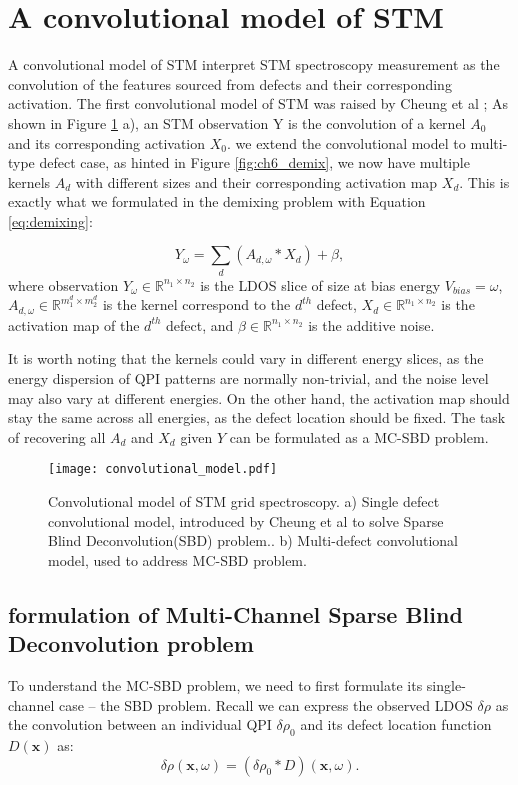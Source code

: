 \section{A convolutional model of STM}
A convolutional model of STM interpret STM spectroscopy measurement as the convolution of the features sourced from defects and their corresponding activation. The first convolutional model of STM was raised by Cheung et al \cite{cheungDictionaryLearningFouriertransform2020}; As shown in Figure \ref{fig:ch6_conv} a), an STM observation Y is the convolution of a kernel $A_0$ and its corresponding activation $X_0$. we extend the convolutional model to multi-type defect case, as hinted in Figure \ref{fig:ch6_demix}, we now have multiple kernels $A_d$ with different sizes and their corresponding activation map $X_d$. This is exactly what we formulated in the demixing problem with Equation \ref{eq:demixing}:

\begin{equation}
	Y_{\omega} = \sum_d ( A_{d,{\omega}} * X_d) + \beta,
\end{equation}
\noindent where observation $Y_{\omega} \in \mathbb{R}^{n_1 \times n_2}$ is the \ac{LDOS} slice of size at bias energy $V_{bias} = \omega$, $A_{d,{\omega}} \in \mathbb{R}^{m_1^d \times m_2^d}$ is the kernel correspond to the $d^{th}$ defect, $X_{d} \in \mathbb{R}^{n_1 \times n_2}$ is the activation map of the $d^{th}$ defect, and $\beta \in \mathbb{R}^{n_1 \times n_2}$ is the additive noise. 

\noindent It is worth noting that the kernels could vary in different energy slices, as the energy dispersion of QPI patterns are normally non-trivial, and the noise level may also vary at different energies. On the other hand, the activation map should stay the same across all energies, as the defect location should be fixed. The task of recovering all $A_d$ and $X_d$ given $Y$ can be formulated as a \ac{MC-SBD} problem. 
 
\begin{figure}
	\texttt{[image: convolutional\_model.pdf]} 
	\centering
	\caption{Convolutional model of STM grid spectroscopy. a) Single defect convolutional model, introduced by Cheung et al to solve Sparse Blind Deconvolution(SBD) problem.\cite{cheungDictionaryLearningFouriertransform2020}. b) Multi-defect convolutional model, used to address \ac{MC-SBD} problem.}
	\label{fig:ch6_conv}
\end{figure}


\subsection{formulation of Multi-Channel Sparse Blind Deconvolution problem}
To understand the \ac{MC-SBD} problem, we need to first formulate its single-channel case --  the \ac{SBD} problem. Recall we can express the observed \ac{LDOS} $\delta\rho$ as the convolution between an individual QPI $\delta\rho_0$ and its defect location function $D(\mathbf{x})$ as: 
\begin{equation}
	\delta \rho(\mathbf{x}, \omega) = (\delta \rho_0 *D)(\mathbf{x}, \omega).
\end{equation}

